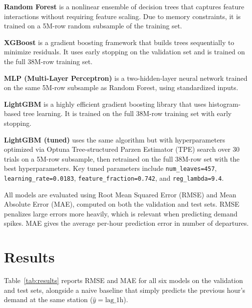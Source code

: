 \documentclass{article}
\begin{document}
\textbf{Random Forest} \citep{breiman2001random} is a nonlinear ensemble of
decision trees that captures feature interactions without requiring feature
scaling. Due to memory constraints, it is trained on a 5M-row random subsample
of the training set.

\textbf{XGBoost} \citep{chen2016xgboost} is a gradient boosting framework that
builds trees sequentially to minimize residuals. It uses early stopping on the
validation set and is trained on the full 38M-row training set.

\textbf{MLP (Multi-Layer Perceptron)} is a two-hidden-layer neural network
trained on the same 5M-row subsample as Random Forest, using standardized
inputs.

\textbf{LightGBM} \citep{ke2017lightgbm} is a highly efficient gradient
boosting library that uses histogram-based tree learning. It is trained on the
full 38M-row training set with early stopping.

\textbf{LightGBM (tuned)} uses the same algorithm but with hyperparameters
optimized via Optuna \citep{akiba2019optuna} Tree-structured Parzen Estimator
(TPE) search over 30 trials on a 5M-row subsample, then retrained on the full
38M-row set with the best hyperparameters. Key tuned parameters include
\texttt{num\_leaves=457}, \texttt{learning\_rate=0.0183},
\texttt{feature\_fraction=0.742}, and \texttt{reg\_lambda=9.4}.

All models are evaluated using Root Mean Squared Error (RMSE) and Mean Absolute
Error (MAE), computed on both the validation and test sets. RMSE penalizes large
errors more heavily, which is relevant when predicting demand spikes. MAE gives
the average per-hour prediction error in number of departures.

\section{Results}

Table~\ref{tab:results} reports RMSE and MAE for all six models on the
validation and test sets, alongside a naive baseline that simply predicts
the previous hour's demand at the same station ($\hat{y} = \text{lag\_1h}$).
\end{document}
